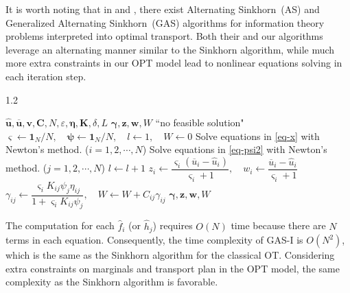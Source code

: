 \documentclass[review,hidelinks,onefignum,onetabnum]{siamart220329}
\begin{document}
\begin{sloppypar}
\begin{remark}
    It is worth noting that in \cite{wu2023communication} and \cite{chen2023information}, 
    there exist Alternating Sinkhorn~(AS) and Generalized Alternating Sinkhorn~(GAS) algorithms for information theory problems interpreted into optimal transport. Both their and our algorithms leverage an alternating manner similar to the Sinkhorn algorithm, while much more extra constraints in our OPT model lead to nonlinear equations solving in each iteration step. 
\end{remark}
\end{sloppypar}
\renewcommand{\thealgorithm}{I}
\begin{algorithm}[t]
	\renewcommand{\algorithmicrequire}{\textbf{Input:}}
	\renewcommand{\algorithmicensure}{\textbf{Output:}}
		\caption{The GAS-I Algorithm for the OPT Model}
		\label{alg:MRM}
            \begin{spacing}{1.2}
		\begin{algorithmic}[1]
			\REQUIRE $\bm{\hat{u}},\bm{\overline{u}},\bm{v},\bm{C},N,\varepsilon,\bm{\eta},\bm{K}, \delta,L$
			\ENSURE $\bm{\gamma}, \bm{z}, \bm{w}, W$
             ``no feasible solution"
            \ENDIF
			\STATE $\bm{\varsigma}\leftarrow \bm{1}_N/N,\quad \bm{\psi}\leftarrow  \bm{1}_N/N,\quad l\leftarrow  1, \quad W\leftarrow 0$
			\STATE  Solve equations in \cref{eq-x} with Newton's method. ($i=1,2,\cdots ,N$)
			\STATE  Solve equations in \cref{eq-psi2} with Newton's method. ($j=1,2,\cdots ,N$)
			\STATE $l\leftarrow l+1$
			\ENDWHILE
            \STATE $z_i\leftarrow \dfrac{\varsigma_i(\overline{u}_i-\hat{u}_i)}{\varsigma_i+1},\quad w_i \leftarrow  \dfrac{\overline{u}_i-\hat{u}_i}{\varsigma_i+1}$
			\STATE $\gamma_{ij}\leftarrow \dfrac{\varsigma_i K_{ij} \psi_j\eta_{ij}}{1+\varsigma_i K_{ij} \psi_j}, \quad W\leftarrow  W+C_{ij}\gamma_{ij}$
			\ENDFOR
			\ENDFOR
            \RETURN $\bm{\gamma}, \bm{z}, \bm{w}, W$
		\end{algorithmic}
            \end{spacing}
\end{algorithm}

The computation for each $\hat{f}_i$ (or $\hat{h}_j$) requires $O(N)$ time because there are $N$ terms in each equation. Consequently, the time complexity of GAS-I is $O(N^2)$, which is the same as the Sinkhorn algorithm for the classical OT.  
Considering extra constraints on marginals and transport plan in the OPT model, the same complexity as the Sinkhorn algorithm is favorable.
\end{document}
